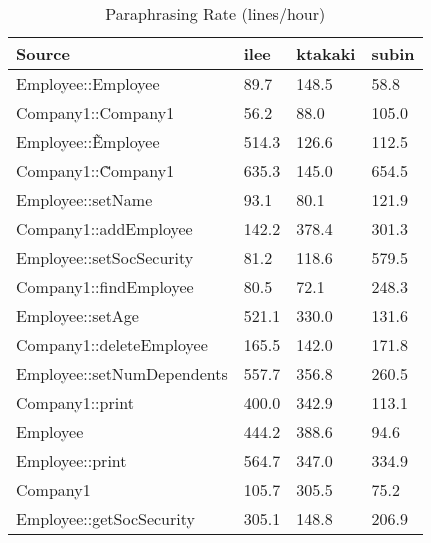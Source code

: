 \begin{table}[hb]
\begin{center}
\begin{tabular}{|l|l|l|l|}
\hline
Source & ilee & ktakaki & subin\\
\hline
Employee::Employee & 89.7 & 148.5 & 58.8\\
Company1::Company1 & 56.2 & 88.0 & 105.0\\
Employee::\~Employee & 514.3 & 126.6 & 112.5\\
Company1::\~Company1 & 635.3 & 145.0 & 654.5\\
Employee::setName & 93.1 & 80.1 & 121.9\\
Company1::addEmployee & 142.2 & 378.4 & 301.3\\
Employee::setSocSecurity & 81.2 & 118.6 & 579.5\\
Company1::findEmployee & 80.5 & 72.1 & 248.3\\
Employee::setAge & 521.1 & 330.0 & 131.6\\
Company1::deleteEmployee & 165.5 & 142.0 & 171.8\\
Employee::setNumDependents & 557.7 & 356.8 & 260.5\\
Company1::print & 400.0 & 342.9 & 113.1\\
Employee & 444.2 & 388.6 & 94.6\\
Employee::print & 564.7 & 347.0 & 334.9\\
Company1 & 105.7 & 305.5 & 75.2\\
Employee::getSocSecurity & 305.1 & 148.8 & 206.9\\
\hline
\end{tabular}
\end{center}
\caption{Paraphrasing Rate (lines/hour)}
\end{table}

